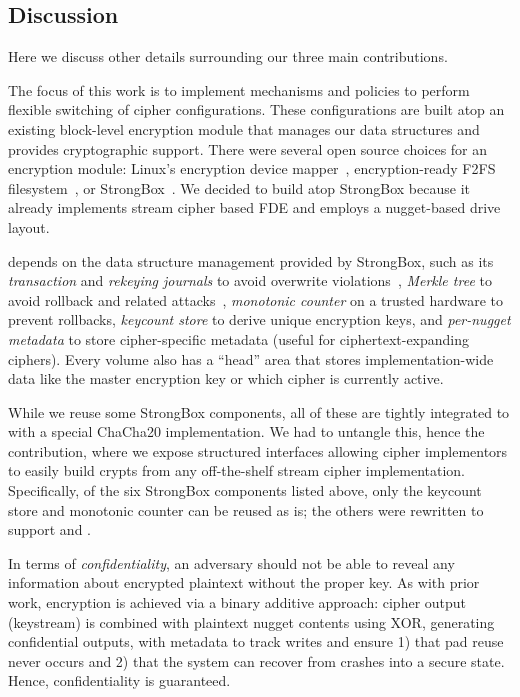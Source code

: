 \subsection{Discussion}\label{subsec:des-discussion}

Here we discuss other details surrounding our three main contributions.


 The focus of this work is to implement
mechanisms and policies to perform flexible switching of cipher configurations.
These configurations are built atop an existing block-level encryption module
that manages our data structures and provides cryptographic support. There were
several open source choices for an encryption module: Linux's encryption device
mapper~\cite{dmcrypt,DmC-Android}, encryption-ready F2FS filesystem~\cite{F2FS},
or StrongBox~\cite{StrongBox}. We decided to build \sys atop StrongBox because
it already implements stream cipher based FDE and employs a nugget-based drive
layout.

\sys depends on the data structure management provided by StrongBox, such as its
{\em transaction} and {\em rekeying journals} to avoid overwrite
violations~\cite{StrongBox}, {\em Merkle tree} to avoid rollback and related
attacks~\cite{StrongBox}, {\em monotonic counter} on a trusted hardware to
prevent rollbacks, {\em keycount store} to derive unique encryption keys, and
{\em per-nugget metadata} to store cipher-specific metadata (useful for
ciphertext-expanding ciphers). Every \sys volume also has a ``head'' area that
stores implementation-wide data like the master encryption key or which cipher
is currently active.

While we reuse some StrongBox components, all of these are tightly integrated to
with a special ChaCha20 implementation. We had to untangle this, hence the \sysB
contribution, where we expose structured interfaces allowing cipher implementors
to easily build crypts from any off-the-shelf stream cipher implementation.
Specifically, of the six StrongBox components listed above, only the keycount
store and monotonic counter can be reused as is; the others were rewritten to
support \sysA and \sysB.


 In terms of {\em confidentiality}, an
adversary should not be able to reveal any information about encrypted plaintext
without the proper key. As with prior work, encryption is achieved via a binary
additive approach: cipher output (keystream) is combined with plaintext nugget
contents using XOR, generating confidential outputs, with metadata to track
writes and ensure 1) that pad reuse never occurs and 2) that the system can
recover from crashes into a secure state. Hence, confidentiality is guaranteed.


